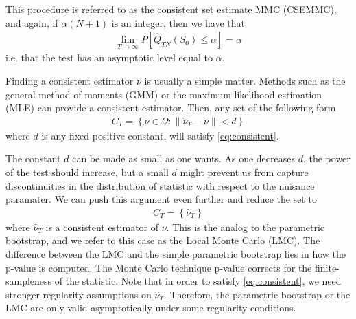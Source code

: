 \documentclass[]{article}\usepackage[]{graphicx}\usepackage[]{color}
\begin{document}
This procedure is referred to as the consistent set estimate MMC (CSEMMC), and again, if $\alpha (N+1)$ is an integer, then we have that
\begin{align}
\lim\limits_{T \rightarrow \infty} P [\hat{Q}_{TN}(S_0) \leq \alpha] = \alpha
\end{align}
i.e. that the test has an asymptotic level equal to $\alpha$.

Finding a consistent estimator $\hat{\nu}$ is usually a simple matter. Methods such as the general method of moments (GMM) or the maximum likelihood estimation (MLE) can provide a consistent estimator. Then, any set of the following form
\begin{align}
C_T = \left\lbrace \nu \in \Omega : \parallel \hat{\nu}_T - \nu \parallel < d \right\rbrace
\end{align}
where $d$ is any fixed positive constant, will satisfy \ref{eq:consistent}.

The constant $d$ can be made as small as one wants. As one decreases $d$, the power of the test should increase, but a small $d$ might prevent us from capture discontinuities in the distribution of statistic with respect to the nuisance paramater. We can push this argument even further and reduce the set to
\begin{align}
C_T = \left\lbrace \hat{\nu}_T \right\rbrace
\end{align}
where $\hat{\nu}_T$ is a consistent estimator of $\nu$. This is the analog to the parametric bootstrap, and we refer to this case as the Local Monte Carlo (LMC). The difference between the LMC and the simple parametric bootstrap lies in how the p-value is computed. The Monte Carlo technique p-value corrects for the finite-sampleness of the statistic. Note that in order to satisfy \ref{eq:consistent}, we need stronger regularity assumptions on $\hat{\nu}_T$. Therefore, the parametric bootstrap or the LMC are only valid asymptotically under some regularity conditions.
\end{document}
